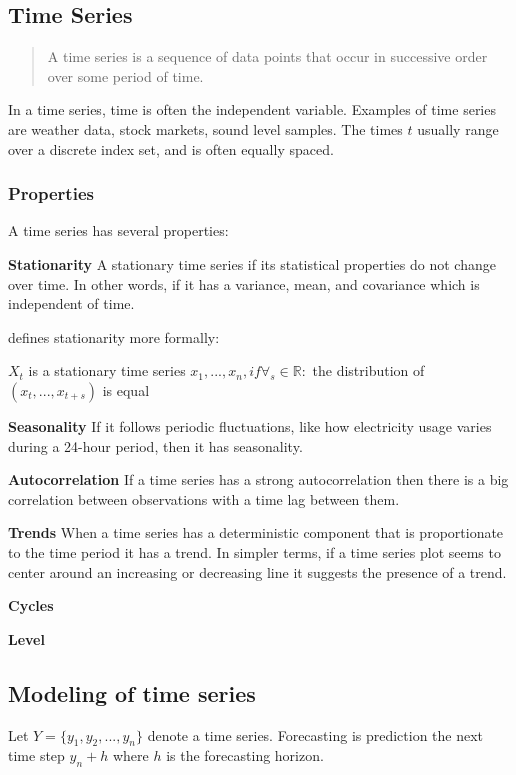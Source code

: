 \subsection{Time Series}
\label{sec:time-series}
\begin{quote}
    A time series is a sequence of data
    points that occur in successive order over some period of time.
\end{quote}
\cite{Hayes}

In a time series, time is often the independent variable.
Examples of time series are weather data, stock markets, sound level samples.
The times $t$ usually range over a discrete index set, and is often equally spaced.

\subsubsection{Properties}
A time series has several properties:

\textbf{Stationarity}
A stationary time series if its statistical properties do not change over time.
In other words, if it has a variance, mean, and covariance which is independent of time.

\cite{RobJHyndman2014} defines stationarity more formally:
\begin{definition}
   $X_t$ is a stationary time series 
   $x_1, ..., x_n, if \forall_s \in \mathbb{R} :$
   the distribution of $(x_t, ..., x_{t+s})$ is equal
\end{definition}

\textbf{Seasonality}
If it follows periodic fluctuations, like how electricity usage varies during a 24-hour period,
then it has seasonality.

\textbf{Autocorrelation}
If a time series has a strong autocorrelation then there is a big
correlation between observations with a time lag between them.

\textbf{Trends}
When a time series has a deterministic component that is proportionate to the time period it has a trend.
In simpler terms, if a time series plot seems to center around an increasing or decreasing line it suggests the presence of a trend.

\textbf{Cycles}

\textbf{Level}


\subsection{Modeling of time series}
Let  $Y = \{y_1, y_2, ..., y_n\}$ denote a time series.
Forecasting is prediction the next time step $y_n+h$ where $h$ is the forecasting horizon.

